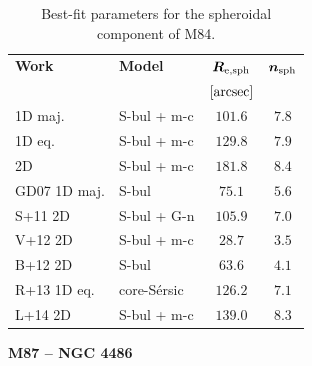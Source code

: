 \documentclass[preprint2]{emulateapj}
\begin{document}
  \begin{table}[h]
  \small
  \caption{Best-fit parameters for the spheroidal component of M84.}
  \begin{center}
  \begin{tabular}{llcc}
  \hline
  {\bf Work} & {\bf Model}   & $\bm R_{\rm e,sph}$    & $\bm n_{\rm sph}$ \\
    &  &  $[\rm arcsec]$ & \\
  \hline
  1D maj. & S-bul + m-c   & $101.6$  &  $7.8$ \\
  1D eq.  & S-bul + m-c   & $129.8$  &  $7.9$ \\
  2D      & S-bul + m-c   & $181.8$  &  $8.4$ \\
  \hline
  GD07 1D maj.         & S-bul         & $75.1$   &  $5.6$ \\
  S+11 2D         & S-bul + G-n   & $105.9$  &  $7.0$ \\
  V+12 2D         & S-bul + m-c   & $28.7$   &  $3.5$ \\
  B+12 2D         & S-bul         & $63.6$   &  $4.1$ \\
  R+13 1D eq.         & core-S\'ersic & $126.2$  &  $7.1$ \\
  L+14 2D         & S-bul + m-c   & $139.0$  &  $8.3$ \\
  \hline
  \end{tabular}
  \end{center}
  \label{tab:m84}
  \end{table}

  \clearpage\newpage\noindent
  {\bf M87 -- NGC 4486 \\}
\end{document}
